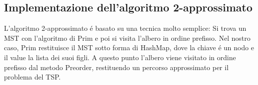 \subsection{Implementazione dell'algoritmo 2-approssimato}
L'algoritmo 2-approssimato \'e basato su una tecnica molto semplice: Si trova un MST con l'algoritmo di Prim e poi si visita l'albero in ordine prefisso.
Nel nostro caso, Prim restituisce il MST sotto forma di HashMap, dove la chiave \'e un nodo e il value la lista dei suoi figli. A questo punto l'albero viene visitato in ordine
prefisso dal metodo Preorder, restituendo un percorso approssimato per il problema del TSP.